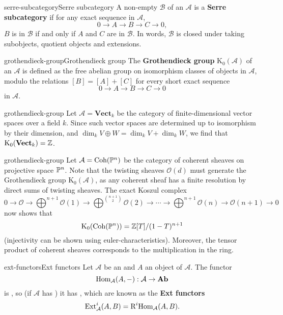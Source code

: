 \begin{topic}{serre-subcategory}{Serre subcategory}
    A non-empty  $\mathcal{B}$ of an  $\mathcal{A}$ is a \textbf{Serre subcategory} if for any exact sequence in $\mathcal{A}$,
    \[ 0 \to A \to B \to C \to 0 , \]
    $B$ is in $\mathcal{B}$ if and only if $A$ and $C$ are in $\mathcal{B}$. In words, $\mathcal{B}$ is closed under taking subobjects, quotient objects and extensions.
\end{topic}

\begin{topic}{grothendieck-group}{Grothendieck group}
    The \textbf{Grothendieck group} $\text{K}_0(\mathcal{A})$ of an  $\mathcal{A}$ is defined as the free abelian group on isomorphism classes of objects in $\mathcal{A}$, modulo the relations $[B] = [A] + [C]$ for every short exact sequence
    \[ 0 \to A \to B \to C \to 0 \]
    in $\mathcal{A}$.
\end{topic}

\begin{example}{grothendieck-group}
    Let $\mathcal{A} = \textbf{Vect}_k$ be the category of finite-dimensional vector spaces over a field $k$. Since such vector spaces are determined up to isomorphism by their dimension, and $\dim_k V \oplus W = \dim_k V + \dim_k W$, we find that $\text{K}_0(\textbf{Vect}_k) = \mathbb{Z}$.
\end{example}

\begin{example}{grothendieck-group}
    Let $\mathcal{A} = \text{Coh}(\mathbb{P}^n)$ be the category of coherent sheaves on projective space $\mathbb{P}^n$. Note that the twisting sheaves $\mathcal{O}(d)$ must generate the Grothendieck group $\text{K}_0(\mathcal{A})$, as any coherent sheaf has a finite resolution by direct sums of twisting sheaves. The exact Koszul complex
    \[ 0 \to \mathcal{O} \to \bigoplus^{n + 1} \mathcal{O}(1) \to \bigoplus^{\binom{n + 1}{2}} \mathcal{O}(2) \to \cdots \to \bigoplus^{n + 1} \mathcal{O}(n) \to \mathcal{O}(n + 1) \to 0 \]
    now shows that
    \[ \text{K}_0(\text{Coh}(\mathbb{P}^n)) = \mathbb{Z}[T] / (1 - T)^{n + 1} \]
    (injectivity can be shown using euler-characteristics). Moreover, the tensor product of coherent sheaves corresponds to the multiplication in the ring.
\end{example}

\begin{topic}{ext-functors}{Ext functors}
    Let $\mathcal{A}$ be an  and $A$ an object of $\mathcal{A}$. The functor
    \[ \text{Hom}_{\mathcal{A}}(A, -) : \mathcal{A} \to \textbf{Ab} \]
    is , so (if $\mathcal{A}$ has ) it has , which are known as the \textbf{Ext functors}
    \[ \text{Ext}^i_\mathcal{A}(A, B) = \text{R}^i \text{Hom}_\mathcal{A}(A, B) . \]
\end{topic}

